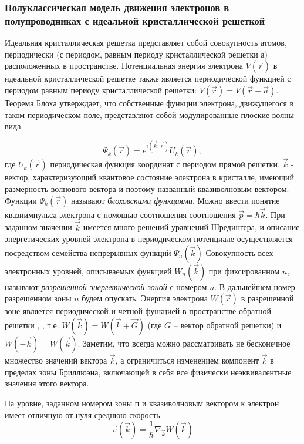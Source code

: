 \subsubsection{Полуклассическая модель движения электронов в полупроводниках с идеальной кристаллической решеткой}

Идеальная кристаллическая решетка представляет собой совокупность
атомов, периодически (с периодом, равным периоду кристаллической решетки
а) расположенных в пространстве. Потенциальная энергия электрона $V(\vec r)$ в
идеальной кристаллической решетке также является периодической функцией с
периодом равным периоду кристаллической решетки: $V(\vec r)=V(\vec r + \vec a)$. Теорема
Блоха утверждает, что собственные функции электрона, движущегося в таком
периодическом поле, представляют собой модулированные плоские волны вида

\begin{equation}
	\Psi_k (\vec r)= e^{i(\vec k, \vec r)} U_k(\vec r), 
\end{equation}
где $U_k(\vec r)$ периодическая функция координат с периодом прямой решетки, $\vec k$
- вектор, характеризующий квантовое состояние электрона в кристалле, имеющий размерность волнового вектора и поэтому названный квазиволновым вектором. Функции $\Psi_k(\vec r)$ называют \textit{блоховскими функциями}. Можно ввести понятие квазиимпульса электрона с помощью соотношения соотношения $\vec p = \hbar \vec k$. При заданном значении $\vec k$ имеется много решений уравнений Шредингера, и описание энергетических уровней электрона в периодическом потенциале осуществляется посредством семейства непрерывных функций $\Psi_n(\vec k)$ Совокупность всех электронных уровней, описываемых функцией $W_n(\vec k)$ при фиксированном $n$, называют \textit{разрешенной энергетической зоной} с номером $n$. В дальнейшем номер разрешенном
зоны $n$ будем опускать. Энергия электрона $W(\vec r)$ в разрешенной зоне является
периодической и четной функцией в пространстве обратной решетки \cite{lit1},\cite{lit2} , т.е.
$W(\vec k)= W(\vec k + \vec G)$  (где $G$ -- вектор обратной решетки) и 
$W(- \vec{k})=W(\vec k)$. Заметим, что всегда можно рассматривать не бесконечное множество значений вектора $\vec k$, а ограничиться изменением компонент $\vec k$  в пределах зоны Бриллюэна, включающей в себя все физически неэквивалентные значения этого вектора.

На уровне, заданном номером зоны п и квазиволновым вектором к электрон имеет отличную от нуля среднюю скорость
\begin{equation}
	\vec v (\vec k)= \frac{1}{\hbar} \nabla_{\vec k} W(\vec k)
\end{equation}

